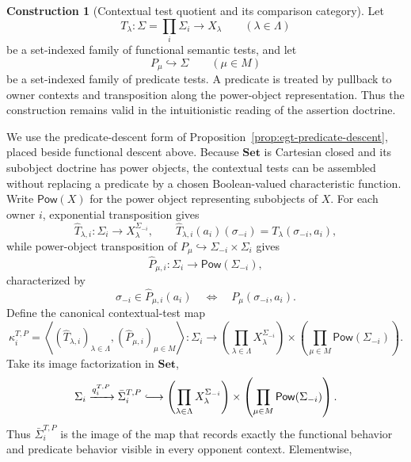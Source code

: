 \documentclass[11pt,a4paper]{article}
\numberwithin{equation}{section}
\theoremstyle{definition}
\newtheorem{construction}[construction]{Construction}
\theoremstyle{remark}
\theoremstyle{plain}
\begin{document}
\begin{construction}[Contextual test quotient and its comparison category]
Let
\[
 T_\lambda:\Sigma=\prod_i\Sigma_i\longrightarrow X_\lambda
 \qquad(\lambda\in\Lambda)
\]
be a set-indexed family of functional semantic tests, and let
\[
 P_\mu\hookrightarrow\Sigma
 \qquad(\mu\in M)
\]
be a set-indexed family of predicate tests. A predicate is treated by pullback to owner contexts and transposition along the power-object representation. Thus the construction remains valid in the
intuitionistic reading of the assertion doctrine.

We use the predicate-descent form of
Proposition~\ref{prop:egt-predicate-descent}, placed beside functional descent
above. Because $\mathbf{Set}$ is Cartesian closed and its subobject doctrine has
power objects, the contextual tests can be assembled without replacing a
predicate by a chosen Boolean-valued characteristic function. Write
$\mathsf{Pow}(X)$ for the power object representing subobjects of $X$.
For each owner $i$, exponential transposition gives
\[
 \widehat T_{\lambda,i}:\Sigma_i\longrightarrow
 X_\lambda^{\Sigma_{-i}},
 \qquad
 \widehat T_{\lambda,i}(a_i)(\sigma_{-i})
 =T_\lambda(\sigma_{-i},a_i),
\]
while power-object transposition of
$P_\mu\hookrightarrow\Sigma_{-i}\times\Sigma_i$ gives
\[
 \widehat P_{\mu,i}:\Sigma_i\longrightarrow
 \mathsf{Pow}(\Sigma_{-i}),
\]
characterized by
\[
 \sigma_{-i}\in\widehat P_{\mu,i}(a_i)
 \quad\Longleftrightarrow\quad
 P_\mu(\sigma_{-i},a_i).
\]
Define the canonical contextual-test map
\begin{equation}
\label{eq:egt-contextual-test-map}
 \kappa_i^{T,P}
 =\left\langle
   (\widehat T_{\lambda,i})_{\lambda\in\Lambda},
   (\widehat P_{\mu,i})_{\mu\in M}
  \right\rangle:
 \Sigma_i\longrightarrow
 \left(\prod_{\lambda\in\Lambda}X_\lambda^{\Sigma_{-i}}\right)
 \times
 \left(\prod_{\mu\in M}\mathsf{Pow}(\Sigma_{-i})\right).
\end{equation}
Take its image factorization in $\mathbf{Set}$,
\begin{equation}
\label{eq:egt-test-image-factorization}
 \Sigma_i\xrightarrow{q_i^{T,P}}\bar\Sigma_i^{T,P}
 \lhook\joinrel\longrightarrow
 \left(\prod_{\lambda\in\Lambda}X_\lambda^{\Sigma_{-i}}\right)
 \times
 \left(\prod_{\mu\in M}\mathsf{Pow}(\Sigma_{-i})\right).
\end{equation}
Thus $\bar\Sigma_i^{T,P}$ is the image of the map that records exactly the
functional behavior and predicate behavior visible in every opponent context.
Elementwise,
\begin{equation}

\end{equation}
\end{construction}
\end{document}
